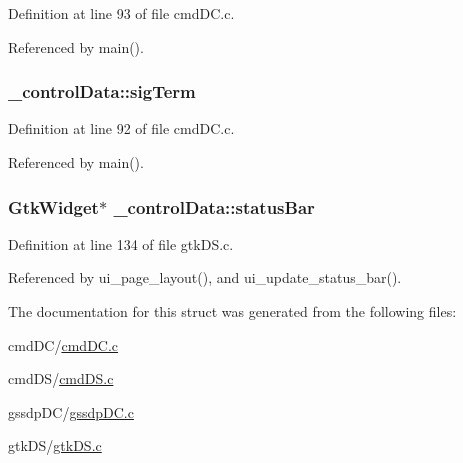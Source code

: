 Definition at line 93 of file cmd\+D\+C.\+c.



Referenced by main().

\hypertarget{struct__control_data_af45dc1f0c4806eaac0a57da17db50fdb}{
\subsubsection[{sig\+Term}]{ \+\_\+control\+Data\+::sig\+Term}}\label{struct__control_data_af45dc1f0c4806eaac0a57da17db50fdb}


Definition at line 92 of file cmd\+D\+C.\+c.



Referenced by main().

\hypertarget{struct__control_data_a661ed960369e640e5f56da1abe7c2168}{
\subsubsection[{status\+Bar}]{\setlength{\rightskip}{0pt plus 5cm}Gtk\+Widget$\ast$ \+\_\+control\+Data\+::status\+Bar}}\label{struct__control_data_a661ed960369e640e5f56da1abe7c2168}


Definition at line 134 of file gtk\+D\+S.\+c.



Referenced by ui\+\_\+page\+\_\+layout(), and ui\+\_\+update\+\_\+status\+\_\+bar().



The documentation for this struct was generated from the following files\+:\begin{DoxyCompactItemize}
\item 
cmd\+D\+C/\hyperlink{cmd_d_c_8c}{cmd\+D\+C.\+c}\item 
cmd\+D\+S/\hyperlink{cmd_d_s_8c}{cmd\+D\+S.\+c}\item 
gssdp\+D\+C/\hyperlink{gssdp_d_c_8c}{gssdp\+D\+C.\+c}\item 
gtk\+D\+S/\hyperlink{gtk_d_s_8c}{gtk\+D\+S.\+c}\end{DoxyCompactItemize}
